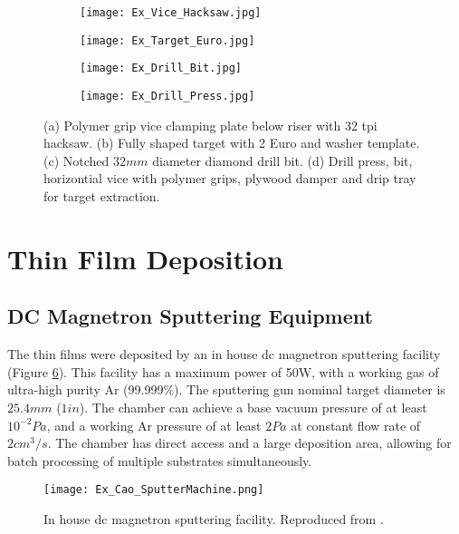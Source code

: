 \documentclass[a4paper,12pt,oneside]{report}%
\begin{document}
\begin{figure}[htbp]
	\centering
	\begin{subfigure}[htbp]{0.49\textwidth}
		\texttt{[image: Ex\_Vice\_Hacksaw.jpg]}
		\caption{}
		\label{fig:Vice}
	\end{subfigure}
	\begin{subfigure}[htbp]{0.38\textwidth}
		\texttt{[image: Ex\_Target\_Euro.jpg]}
		\caption{}
		\label{fig:TargetEuro}
	\end{subfigure}
	\begin{subfigure}[htbp]{0.275\textwidth}
		\texttt{[image: Ex\_Drill\_Bit.jpg]}
		\caption{}
		\label{fig:DrillBit}
	\end{subfigure}
	\begin{subfigure}[htbp]{0.30\textwidth}
		\texttt{[image: Ex\_Drill\_Press.jpg]}
		\caption{}
		\label{fig:DrillPress}
	\end{subfigure}
	\caption{(a) Polymer grip vice clamping plate below riser with 32 \acrshort{tpi} hacksaw. (b) Fully shaped target with 2 Euro and washer template. (c) Notched $32 mm$ diameter diamond drill bit. (d) Drill press, bit, horizontial vice with polymer grips, plywood damper and drip tray for target extraction.}%
	\label{fig:ShapingEquipment}
\end{figure}

\section{Thin Film Deposition}
\subsection{DC Magnetron Sputtering Equipment}
The thin films were deposited by an in house \acrshort{dc} magnetron sputtering facility (Figure \ref{fig:CaoSputtering}). This facility has a maximum power of 50W, with a working gas of ultra-high purity Ar (99.999\%). The sputtering gun nominal target diameter is $25.4mm$ ($1in$). The chamber can achieve a base vacuum pressure of at least $10^{-2} Pa$, and a working Ar pressure of at least $2 Pa$ at constant flow rate of $2 cm^{3}/s$. The chamber has direct access and a large deposition area, allowing for batch processing of multiple substrates simultaneously.

\begin{figure}[htbp]
	\centering
	\texttt{[image: Ex\_Cao\_SputterMachine.png]}
	\caption[In house \acrshort{dc} magnetron sputtering facility.]{In house \acrshort{dc} magnetron sputtering facility. Reproduced from \cite{Cao2013}.}
	\label{fig:CaoSputtering}
\end{figure}
\end{document}
